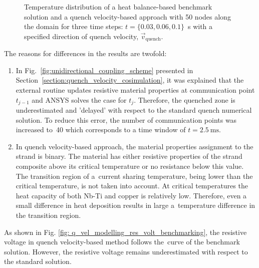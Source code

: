 \begin{figure}[H]
    \caption{Temperature distribution of a heat balance-based benchmark solution and a quench velocity-based approach with 50 nodes along the domain for three time steps: $t=\{0.03, 0.06, 0.1\}$~s with a specified direction of quench velocity, $\vec{v}_\text{quench}$.}
    \label{fig: q_vel_benchmarking_temp_distr_over_strand_no_insulation}
\end{figure}

The reasons for differences in the results are twofold:
\begin{enumerate}
    \item In Fig.~\ref{fig:unidirectional_coupling_scheme} presented in Section~\ref{section:quench_velocity_cosimulation}, it was explained that the external routine updates resistive material properties at communication point $t_{j-1}$ and ANSYS solves the case for $t_{j}$. Therefore, the quenched zone is underestimated and 'delayed' with respect to the standard quench numerical solution. To reduce this error, the number of communication points was increased to~40 which corresponds to a time window of $t=2.5~\text{ms}$. 
    \item In quench velocity-based approach, the material properties assignment to the strand is binary. The material has either resistive properties of the strand composite above its critical temperature or no resistance below this value. The transition region of a~current sharing temperature, being lower than the critical temperature, is not taken into account. At critical temperatures the heat capacity of both Nb-Ti and copper is relatively low. Therefore, even a small difference in heat deposition results in large a~temperature difference in the transition region. 
\end{enumerate}

As shown in Fig. \ref{fig: q_vel_modelling_res_volt_benchmarking}, the resistive voltage in quench velocity-based method follows the~curve of the benchmark solution. However, the resistive voltage remains underestimated with respect to the standard solution.


